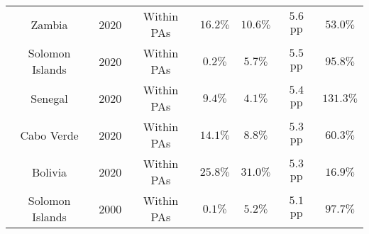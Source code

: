 \begin{longtable}{ccccccc}
Zambia & 2020 & Within PAs & $16.2\%$ & $10.6\%$ & $5.6$ pp & $53.0\%$ \\ 
Solomon Islands & 2020 & Within PAs & $0.2\%$ & $5.7\%$ & $5.5$ pp & $95.8\%$ \\ 
Senegal & 2020 & Within PAs & $9.4\%$ & $4.1\%$ & $5.4$ pp & $131.3\%$ \\ 
Cabo Verde & 2020 & Within PAs & $14.1\%$ & $8.8\%$ & $5.3$ pp & $60.3\%$ \\ 
Bolivia & 2020 & Within PAs & $25.8\%$ & $31.0\%$ & $5.3$ pp & $16.9\%$ \\ 
Solomon Islands & 2000 & Within PAs & $0.1\%$ & $5.2\%$ & $5.1$ pp & $97.7\%$ \\ 
\bottomrule
\end{longtable}


